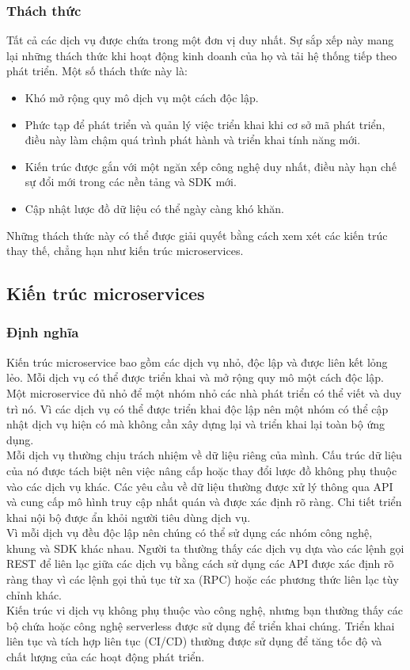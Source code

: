 \subsubsection{Thách thức}
\noindent Tất cả các dịch vụ được chứa trong một đơn vị duy nhất. Sự sắp xếp này mang lại những thách thức khi hoạt động kinh doanh của họ và tải hệ thống tiếp theo phát triển. Một số thách thức này là:
\begin{itemize}
    \item Khó mở rộng quy mô dịch vụ một cách độc lập.
    \item Phức tạp để phát triển và quản lý việc triển khai khi cơ sở mã phát triển, điều này làm chậm quá trình phát hành và triển khai tính năng mới.
    \item Kiến trúc được gắn với một ngăn xếp công nghệ duy nhất, điều này hạn chế sự đổi mới trong các nền tảng và SDK mới.
    \item Cập nhật lược đồ dữ liệu có thể ngày càng khó khăn.
\end{itemize}
Những thách thức này có thể được giải quyết bằng cách xem xét các kiến trúc thay thế, chẳng hạn như kiến trúc microservices.

\subsection{Kiến trúc microservices}
\subsubsection{Định nghĩa}
\noindent Kiến trúc microservice bao gồm các dịch vụ nhỏ, độc lập và được liên kết lỏng lẻo. Mỗi dịch vụ có thể được triển khai và mở rộng quy mô một cách độc lập.\\[0.5cm]
Một microservice đủ nhỏ để một nhóm nhỏ các nhà phát triển có thể viết và duy trì nó. Vì các dịch vụ có thể được triển khai độc lập nên một nhóm có thể cập nhật dịch vụ hiện có mà không cần xây dựng lại và triển khai lại toàn bộ ứng dụng.\\[0.5cm]
Mỗi dịch vụ thường chịu trách nhiệm về dữ liệu riêng của mình. Cấu trúc dữ liệu của nó được tách biệt nên việc nâng cấp hoặc thay đổi lược đồ không phụ thuộc vào các dịch vụ khác. Các yêu cầu về dữ liệu thường được xử lý thông qua API và cung cấp mô hình truy cập nhất quán và được xác định rõ ràng. Chi tiết triển khai nội bộ được ẩn khỏi người tiêu dùng dịch vụ.\\[0.5cm]
Vì mỗi dịch vụ đều độc lập nên chúng có thể sử dụng các nhóm công nghệ, khung và SDK khác nhau. Người ta thường thấy các dịch vụ dựa vào các lệnh gọi REST để liên lạc giữa các dịch vụ bằng cách sử dụng các API được xác định rõ ràng thay vì các lệnh gọi thủ tục từ xa (RPC) hoặc các phương thức liên lạc tùy chỉnh khác.\\[0.5cm]
Kiến trúc vi dịch vụ không phụ thuộc vào công nghệ, nhưng bạn thường thấy các bộ chứa hoặc công nghệ serverless được sử dụng để triển khai chúng. Triển khai liên tục và tích hợp liên tục (CI/CD) thường được sử dụng để tăng tốc độ và chất lượng của các hoạt động phát triển.
